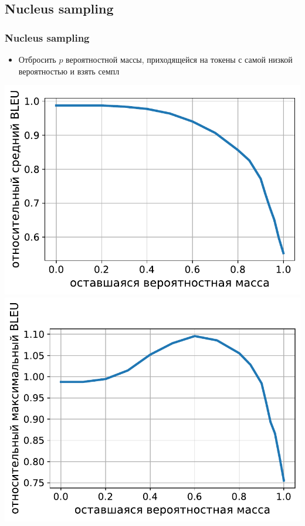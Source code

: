 \documentclass[unicode]{beamer}
\begin{document}
\subsection{Nucleus sampling}
\begin{frame}
\frametitle{Nucleus sampling}
\begin{itemize}
    \item Отбросить $p$ вероятностной массы, приходящейся на токены с самой низкой вероятностью и взять семпл
\end{itemize}
\begin{center}
\includegraphics[scale=0.25]{avg-bleu-nucleus-sampling.pdf}
\includegraphics[scale=0.25]{max-bleu-nucleus-sampling.pdf}
\end{center}


\end{frame}
\end{document}
